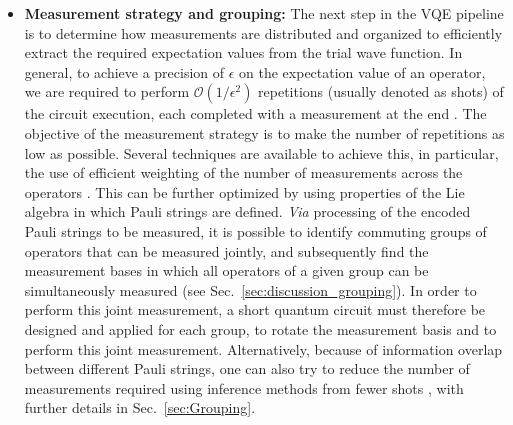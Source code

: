 \begin{itemize}
    \item \textbf{Measurement strategy and grouping:} The next step in the VQE pipeline is to determine how measurements are distributed and organized to efficiently extract the required expectation values from the trial wave function. In general, to achieve a precision of $\epsilon$ on the expectation value of an operator, we are required to perform $\mathcal{O}(1/\epsilon^2)$ repetitions (usually denoted as shots) of the circuit execution, each completed with a measurement at the end \cite{mccleanTheoryVariationalHybrid2015}. The objective of the measurement strategy is to make the number of repetitions as low as possible. Several techniques are available to achieve this, in particular, the use of efficient weighting of the number of measurements across the operators \cite{Wecker2015, Rubin2018, Arrasmith2020}. This can be further optimized by using properties of the Lie algebra in which Pauli strings are defined. \textit{Via} processing of the encoded Pauli strings to be measured, it is possible to identify commuting groups of operators that can be measured jointly, and subsequently find the measurement bases in which all operators of a given group can be simultaneously measured \cite{Gokhale2019_long, Hamamura2020, Huggins2021} (see Sec.~\ref{sec:discussion_grouping}). In order to perform this joint measurement, a short quantum circuit must therefore be designed and applied for each group, to rotate the measurement basis and to perform this joint measurement. Alternatively, because of information overlap between different Pauli strings, one can also try to reduce the number of measurements required using inference methods from fewer shots \cite{Torlai2020, Huang2020}, with further details in Sec.~\ref{sec:Grouping}.

\end{itemize}
